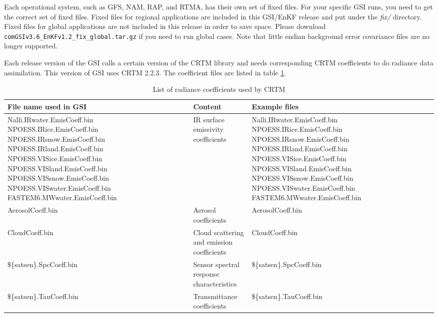 Each operational system, such as GFS, NAM, RAP, and RTMA, has their own set of fixed files. For your specific GSI runs, you need to get the correct set of fixed files. Fixed files for regional applications are included in this GSI/EnKF release and put under the \textit{fix/} directory. Fixed files for global applications are not included in this release in order to save space. Please download \verb|comGSIv3.6_EnKFv1.2_fix_global.tar.gz| if you need to run global cases. Note that little endian background error covariance files are no longer supported.  

Each release version of the GSI calls a certain version of the CRTM library and needs corresponding CRTM coefficients to do radiance data assimilation. This version of GSI uses CRTM 2.2.3. The coefficient files are listed in table \ref{t34}.


\begin{table}[htbp]
\centering
\begin{small}
\caption{List of radiance coefficients used by CRTM}
\begin{tabular}{|p{5.5cm}|p{3.5cm}|p{5.5cm}|}
\hline
\hline
File name used in GSI & Content & Example files \\
\hline
\hline
Nalli.IRwater.EmisCoeff.bin
NPOESS.IRice.EmisCoeff.bin
NPOESS.IRsnow.EmisCoeff.bin
NPOESS.IRland.EmisCoeff.bin
NPOESS.VISice.EmisCoeff.bin
NPOESS.VISland.EmisCoeff.bin
NPOESS.VISsnow.EmisCoeff.bin
NPOESS.VISwater.EmisCoeff.bin
FASTEM6.MWwater.EmisCoeff.bin &	
IR surface emissivity coefficients & 
Nalli.IRwater.EmisCoeff.bin
NPOESS.IRice.EmisCoeff.bin
NPOESS.IRsnow.EmisCoeff.bin
NPOESS.IRland.EmisCoeff.bin
NPOESS.VISice.EmisCoeff.bin
NPOESS.VISland.EmisCoeff.bin
NPOESS.VISsnow.EmisCoeff.bin
NPOESS.VISwater.EmisCoeff.bin
FASTEM6.MWwater.EmisCoeff.bin \\
\hline
AerosolCoeff.bin & Aerosol coefficients & AerosolCoeff.bin \\
\hline
CloudCoeff.bin & Cloud scattering and emission coefficients & CloudCoeff.bin \\
\hline
\$\{satsen\}.SpcCoeff.bin & Sensor spectral response characteristics & \$\{satsen\}.SpcCoeff.bin \\
\hline
\$\{satsen\}.TauCoeff.bin & Transmittance coefficients & \$\{satsen\}.TauCoeff.bin \\
\hline
\end{tabular}
\label{t34} 
\end{small}
\end{table}

